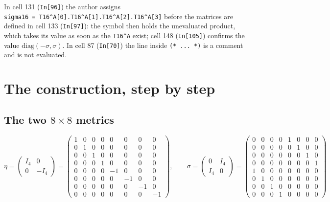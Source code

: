 \documentclass[
  10pt,
]{article}
\begin{document}
In cell 131 (\texttt{In{[}96{]}}) the author assigns
\texttt{sigma16\ =\ T16\^{}A{[}0{]}.T16\^{}A{[}1{]}.T16\^{}A{[}2{]}.T16\^{}A{[}3{]}}
before the matrices are defined in cell 133 (\texttt{In{[}97{]}}): the
symbol then holds the unevaluated product, which takes its value as soon
as the \texttt{T16\^{}A} exist; cell 148 (\texttt{In{[}105{]}}) confirms
the value \(\mathrm{diag}(-\sigma, \sigma)\). In cell 87
(\texttt{In{[}70{]}}) the line inside \texttt{(*\ ...\ *)} is a comment
and is not evaluated.

\hypertarget{the-construction-step-by-step}{%
\section{The construction, step by
step}\label{the-construction-step-by-step}}

\hypertarget{the-two-8-times-8-metrics}{%
\subsection{\texorpdfstring{The two \(8 \times 8\)
metrics}{The two 8 \textbackslash times 8 metrics}}\label{the-two-8-times-8-metrics}}

\[
\eta = \begin{pmatrix} I_4 & 0 \\ 0 & -I_4 \end{pmatrix} = \begin{pmatrix} 1 & 0 & 0 & 0 & 0 & 0 & 0 & 0 \\ 0 & 1 & 0 & 0 & 0 & 0 & 0 & 0 \\ 0 & 0 & 1 & 0 & 0 & 0 & 0 & 0 \\ 0 & 0 & 0 & 1 & 0 & 0 & 0 & 0 \\ 0 & 0 & 0 & 0 & -1 & 0 & 0 & 0 \\ 0 & 0 & 0 & 0 & 0 & -1 & 0 & 0 \\ 0 & 0 & 0 & 0 & 0 & 0 & -1 & 0 \\ 0 & 0 & 0 & 0 & 0 & 0 & 0 & -1 \end{pmatrix},\qquad \sigma = \begin{pmatrix} 0 & I_4 \\ I_4 & 0 \end{pmatrix} = \begin{pmatrix} 0 & 0 & 0 & 0 & 1 & 0 & 0 & 0 \\ 0 & 0 & 0 & 0 & 0 & 1 & 0 & 0 \\ 0 & 0 & 0 & 0 & 0 & 0 & 1 & 0 \\ 0 & 0 & 0 & 0 & 0 & 0 & 0 & 1 \\ 1 & 0 & 0 & 0 & 0 & 0 & 0 & 0 \\ 0 & 1 & 0 & 0 & 0 & 0 & 0 & 0 \\ 0 & 0 & 1 & 0 & 0 & 0 & 0 & 0 \\ 0 & 0 & 0 & 1 & 0 & 0 & 0 & 0 \end{pmatrix}
\]
\end{document}
